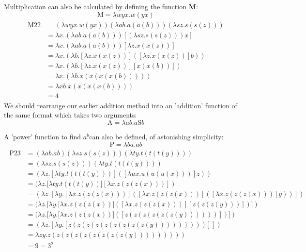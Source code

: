 \documentclass[Master.tex]{subfiles}
\begin{document}
Multiplication can also be calculated by defining the function \textbf{M}:
\begin{equation*}
\bm{\mathrm{M}} = \lambda wyx.w(yx)
\end{equation*}
\begin{gather*}
\begin{aligned}
\bm{\mathrm{M22}} &= (\lambda wyx.w(yx))(\lambda ab.a(a(b)))(\lambda sz.s(s(z)))\\
&= \lambda x.(\lambda ab.a(a(b)))[(\lambda sz.s(s(z)))x]\\
&= \lambda x.(\lambda ab.a(a(b)))[\lambda z.x(x(z))]\\
&= \lambda x.(\lambda b.[\lambda z.x(x(z))]([\lambda z.x(x(z))]b))\\
&= \lambda x.(\lambda b.[\lambda z.x(x(z))][x(x(b))])\\
&= \lambda x.(\lambda b.x(x(x(x(b)))))\\
&= \lambda xb.x(x(x(x(b))))\\
&= \bm{\mathrm{4}}
\end{aligned}
\end{gather*}
We should rearrange our earlier addition method into an 'addition' function of the same format which takes two arguments:
\begin{equation*}
\bm{\mathrm{A}} = \lambda ab.a\bm{\mathrm{S}}b
\end{equation*}

A 'power' function to find $a^b$can also be defined, of astonishing simplicity:
\begin{equation*}
\bm{\mathrm{P}} = \lambda ba.ab
\end{equation*}
\begin{gather*}
\begin{aligned}
\bm{\mathrm{P23}} &= (\lambda ab.ab)(\lambda sz.s(s(z)))(\lambda ty.t(t(t(y))))\\
&= (\lambda sz.s(s(z)))(\lambda ty.t(t(t(y))))\\
&= (\lambda z.[\lambda ty.t(t(t(y)))]([\lambda ux.u(u(u(x)))]z))\\
&= (\lambda z.[\lambda ty.t(t(t(y))][\lambda x.z(z(z(x)))])\\
&= (\lambda z.[\lambda y.[\lambda x.z(z(z(x)))]([\lambda x.z(z(z(x)))]([\lambda x.z(z(z(x)))]y))])\\
&= (\lambda z.[\lambda y.[\lambda x.z(z(z(x))]([\lambda x.z(z(z(x)))][z(z(z(y)))])])\\
&= (\lambda z.[\lambda y.[\lambda x.z(z(z(x))]([z(z(z(z(z(z(y))))))])])\\
&= (\lambda z.[\lambda y.[z(z(z(z(z(z(z(z(z(y)))))))))]])\\
&= \lambda zy.z(z(z(z(z(z(z(z(z(y)))))))))\\
&= \bm{\mathrm{9}} = \bm{\mathrm{3^2}}
\end{aligned}
\end{gather*}
\end{document}
